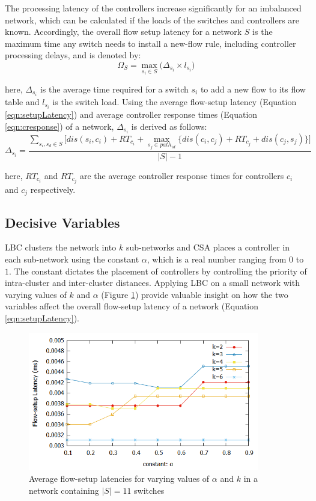 \documentclass[preprint,12pt]{elsarticle}
\begin{document}
	The processing latency of the controllers increase significantly for an imbalanced network, which can be calculated if the loads of the switches and controllers are known. Accordingly, the overall flow setup latency for a network $S$ is the maximum time any switch needs to install a new-flow rule, including controller processing delays, and is denoted by:
	\begin{equation}
	\Omega_S = \max_{s_i\in S} \bigg( \Delta_{s_i}\times l_{s_i} \bigg)
	\end{equation}
	
	here, $\Delta_{s_i}$ is the average time required for a switch $s_i$ to add a new flow to its flow table and $l_{s_i}$ is the switch load. Using the average flow-setup latency (Equation \ref{eqn:setupLatency}) and average controller response times (Equation \ref{eqn:cresponse}) of a network, $\Delta_{s_i}$ is derived as follows:
	\begin{equation}
	\Delta_{s_i} = \frac{\sum_{s_i,s_d\in S} \bigg[dis(s_i,c_i)+RT_{c_i}+\max_{s_j\in path_{id}}\{dis(c_i,c_j)+RT_{c_j}+dis(c_j,s_j) \} \bigg]}{|S|-1}
	\end{equation}
	
	here, $RT_{c_i}$  and $RT_{c_j}$ are the average controller response times for controllers $c_i$ and $c_j$ respectively.
	
	\subsection{Decisive Variables} \label{optimumK}
	LBC clusters the network into $k$ sub-networks and CSA places a controller in each sub-network using the constant $\alpha$, which is a real number ranging from $0$ to $1$. The constant dictates the placement of controllers by controlling the priority of intra-cluster and inter-cluster distances. Applying LBC on a small network with varying values of $k$ and $\alpha$ (Figure \ref{fig:abileneA}) provide valuable insight on how the two variables affect the overall flow-setup latency of a network (Equation \ref{eqn:setupLatency}).
	
	\begin{figure}
		
		\centering
		\includegraphics[width=0.9\textwidth]{Images/Abilene_Analysis.png}
		\caption{Average flow-setup latencies for varying values of $\alpha$ and $k$ in a network containing $|S|=11$ switches} \label{fig:abileneA}
		
	\end{figure}
\end{document}
